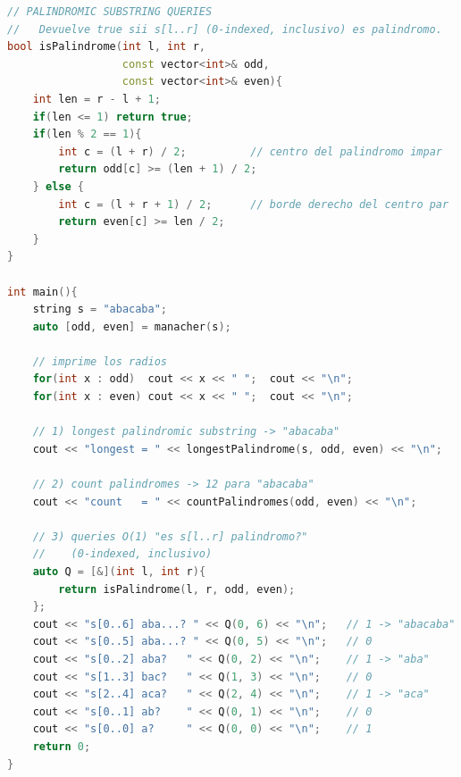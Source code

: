\begin{lstlisting}[style=mystyle, language=C++]
// PALINDROMIC SUBSTRING QUERIES
//   Devuelve true sii s[l..r] (0-indexed, inclusivo) es palindromo.
bool isPalindrome(int l, int r,
				  const vector<int>& odd,
				  const vector<int>& even){
	int len = r - l + 1;
	if(len <= 1) return true;
	if(len % 2 == 1){
		int c = (l + r) / 2;          // centro del palindromo impar
		return odd[c] >= (len + 1) / 2;
	} else {
		int c = (l + r + 1) / 2;      // borde derecho del centro par
		return even[c] >= len / 2;
	}
}

int main(){
	string s = "abacaba";
	auto [odd, even] = manacher(s);

	// imprime los radios
	for(int x : odd)  cout << x << " ";  cout << "\n";
	for(int x : even) cout << x << " ";  cout << "\n";

	// 1) longest palindromic substring -> "abacaba"
	cout << "longest = " << longestPalindrome(s, odd, even) << "\n";

	// 2) count palindromes -> 12 para "abacaba"
	cout << "count   = " << countPalindromes(odd, even) << "\n";

	// 3) queries O(1) "es s[l..r] palindromo?"
	//    (0-indexed, inclusivo)
	auto Q = [&](int l, int r){
		return isPalindrome(l, r, odd, even);
	};
	cout << "s[0..6] aba...? " << Q(0, 6) << "\n";   // 1 -> "abacaba"
	cout << "s[0..5] aba...? " << Q(0, 5) << "\n";   // 0
	cout << "s[0..2] aba?   " << Q(0, 2) << "\n";    // 1 -> "aba"
	cout << "s[1..3] bac?   " << Q(1, 3) << "\n";    // 0
	cout << "s[2..4] aca?   " << Q(2, 4) << "\n";    // 1 -> "aca"
	cout << "s[0..1] ab?    " << Q(0, 1) << "\n";    // 0
	cout << "s[0..0] a?     " << Q(0, 0) << "\n";    // 1
	return 0;
}
\end{lstlisting}
